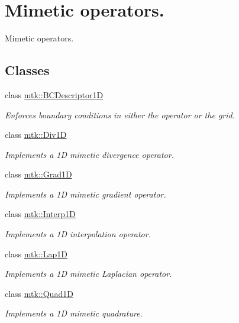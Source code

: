 \hypertarget{group__c07-mim__ops}{\section{Mimetic operators.}
\label{group__c07-mim__ops}
}


Mimetic operators.  


\subsection*{Classes}
\begin{DoxyCompactItemize}
\item 
class \hyperlink{classmtk_1_1BCDescriptor1D}{mtk\+::\+B\+C\+Descriptor1\+D}
\begin{DoxyCompactList}\small\item\em Enforces boundary conditions in either the operator or the grid. \end{DoxyCompactList}\item 
class \hyperlink{classmtk_1_1Div1D}{mtk\+::\+Div1\+D}
\begin{DoxyCompactList}\small\item\em Implements a 1\+D mimetic divergence operator. \end{DoxyCompactList}\item 
class \hyperlink{classmtk_1_1Grad1D}{mtk\+::\+Grad1\+D}
\begin{DoxyCompactList}\small\item\em Implements a 1\+D mimetic gradient operator. \end{DoxyCompactList}\item 
class \hyperlink{classmtk_1_1Interp1D}{mtk\+::\+Interp1\+D}
\begin{DoxyCompactList}\small\item\em Implements a 1\+D interpolation operator. \end{DoxyCompactList}\item 
class \hyperlink{classmtk_1_1Lap1D}{mtk\+::\+Lap1\+D}
\begin{DoxyCompactList}\small\item\em Implements a 1\+D mimetic Laplacian operator. \end{DoxyCompactList}\item 
class \hyperlink{classmtk_1_1Quad1D}{mtk\+::\+Quad1\+D}
\begin{DoxyCompactList}\small\item\em Implements a 1\+D mimetic quadrature. \end{DoxyCompactList}\end{DoxyCompactItemize}
